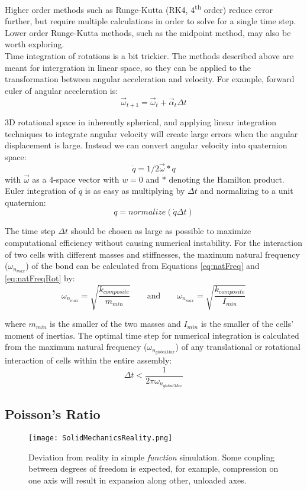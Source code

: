 {Higher order methods such as Runge-Kutta (RK4, 4\textsuperscript{th} order) reduce error further, but require multiple calculations in order to solve for a single time step.  Lower order Runge-Kutta methods, such as the midpoint method, may also be worth exploring.\\

Time integration of rotations is a bit trickier.  The methods described above are meant for intergration in linear space, so they can be applied to the transformation between angular acceleration and velocity.  For example, forward euler of angular acceleration is:
\[ \vec{\omega}_{t+1} = \vec{\omega}_{t} +  \vec{\alpha}_{t}\Delta t\]

3D rotational space in inherently spherical, and applying linear integration techniques to integrate angular velocity will create large errors when the angular displacement is large.  Instead we can convert angular velocity into quaternion space:
\[ \dot{q} = 1/2\vec{\omega}*q\]
with $\vec{\omega}$ as a 4-space vector with $w=0$ and $*$ denoting the Hamilton product.\\

Euler integration of $\dot{q}$ is as easy as multiplying by $\Delta t$ and normalizing to a unit quaternion:
\[ q = normalize(\dot{q}\Delta t)\]

The time step $\Delta t$ should be chosen as large as possible to maximize computational efficiency without causing numerical instability.  For the interaction of two cells with different masses and stiffnesses, the maximum natural frequency ($\omega_{n_{max}}$) of the bond can be calculated from Equations \ref{eq:natFreq} and \ref{eq:natFreqRot} by:
\[ \omega_{n_{max}} = \sqrt{\dfrac{k_{composite}}{m_{min}}} \qquad
\text{and} \qquad \omega_{n_{max}} = \sqrt{\dfrac{k_{composite}}{I_{min}}} \]

where $m_{min}$ is the smaller of the two masses and $I_{min}$ is the smaller of the cells' moment of inertias.  The optimal time step for numerical integration is calculated from the maximum natural frequency ($\omega_{n_{globalMax}}$) of any translational or rotational interaction of cells within the entire assembly:
\[ \Delta t < \dfrac{1}{2\pi\omega_{n_{globalMax}}}  \]

\subsection{Poisson's Ratio}

\begin{figure}
  \texttt{[image: SolidMechanicsReality.png]}
  \caption{Deviation from reality in simple \textit{function} simulation.  Some coupling between degrees of freedom is expected, for example, compression on one axis will result in expansion along other, unloaded axes.}
  \label{fig:SolidMechanicsReality}
\end{figure}

}

